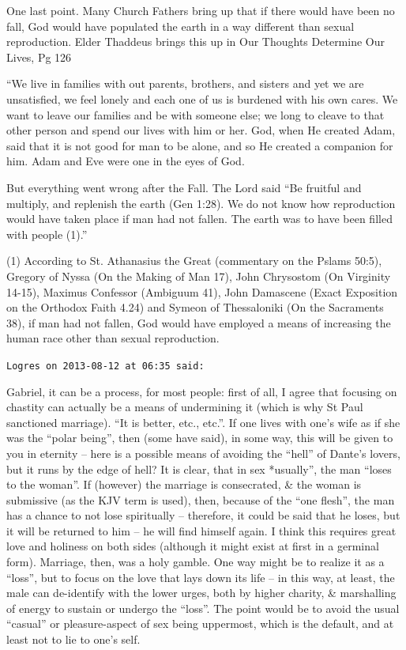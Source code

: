 \begin{footnotesize}
\begin{sffamily}
One last point. Many Church Fathers bring up that if there would have been no fall, God would have populated the earth in a way different than sexual reproduction. Elder Thaddeus brings this up in Our Thoughts Determine Our Lives, Pg 126

``We live in families with out parents, brothers, and sisters and yet we are unsatisfied, we feel lonely and each one of us is burdened with his own cares. We want to leave our families and be with someone else; we long to cleave to that other person and spend our lives with him or her. God, when He created Adam, said that it is not good for man to be alone, and so He created a companion for him. Adam and Eve were one in the eyes of God.

But everything went wrong after the Fall. The Lord said ``Be fruitful and multiply, and replenish the earth (Gen 1:28). We do not know how reproduction would have taken place if man had not fallen. The earth was to have been filled with people (1).''

(1) According to St. Athanasius the Great (commentary on the Pslams 50:5), Gregory of Nyssa (On the Making of Man 17), John Chrysostom (On Virginity 14-15), Maximus Confessor (Ambiguum 41), John Damascene (Exact Exposition on the Orthodox Faith 4.24) and Symeon of Thessaloniki (On the Sacraments 38), if man had not fallen, God would have employed a means of increasing the human race other than sexual reproduction.

\hfill

\texttt{Logres on 2013-08-12 at 06:35 said:}

Gabriel, it can be a process, for most people: first of all, I agree that focusing on chastity can actually be a means of undermining it (which is why St Paul sanctioned marriage). ``It is better, etc., etc.''. If one lives with one's wife as if she was the ``polar being'', then (some have said), in some way, this will be given to you in eternity -- here is a possible means of avoiding the ``hell'' of Dante's lovers, but it runs by the edge of hell? It is clear, that in sex *usually'', the man ``loses to the woman''. If (however) the marriage is consecrated, \& the woman is submissive (as the KJV term is used), then, because of the ``one flesh'', the man has a chance to not lose spiritually -- therefore, it could be said that he loses, but it will be returned to him -- he will find himself again. I think this requires great love and holiness on both sides (although it might exist at first in a germinal form). Marriage, then, was a holy gamble. One way might be to realize it as a ``loss'', but to focus on the love that lays down its life -- in this way, at least, the male can de-identify with the lower urges, both by higher charity, \& marshalling of energy to sustain or undergo the ``loss''. The point would be to avoid the usual ``casual'' or pleasure-aspect of sex being uppermost, which is the default, and at least not to lie to one's self.


\end{sffamily}
\end{footnotesize}

